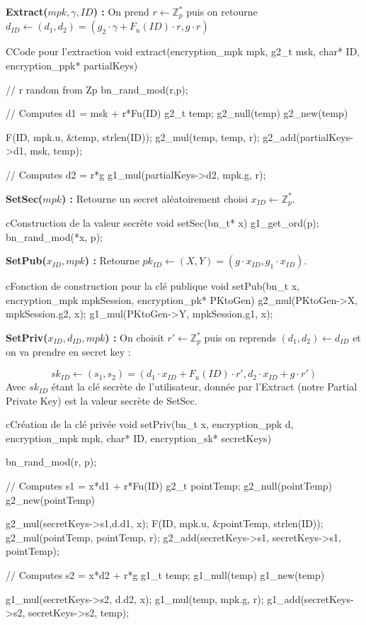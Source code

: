 \textbf{Extract($mpk, \gamma, ID$) :} On prend $r \leftarrow \mathbb{Z}_p^*$ puis on retourne $d_{ID} \leftarrow (d_1, d_2) = (g_2 \cdot \gamma + F_u(ID) \cdot r, g \cdot r)$

\begin{sourcebox}{C}{Code pour l'extraction}
	void extract(encryption_mpk mpk, g2_t msk, char* ID, encryption_ppk* partialKeys){
		// r random from Zp
		bn_rand_mod(r,p);
		
		// Computes d1 = msk + r*Fu(ID)
		g2_t temp;
		g2_null(temp)
		g2_new(temp)
		
		F(ID, mpk.u, &temp, strlen(ID));
		g2_mul(temp, temp, r);
		g2_add(partialKeys->d1, msk, temp);
		
		// Computes d2 = r*g
		g1_mul(partialKeys->d2, mpk.g, r);
	}
\end{sourcebox}

\textbf{SetSec($mpk$) :} Retourne un secret aléatoirement choisi $x_{ID} \leftarrow \mathbb{Z}_p^*$.

\begin{sourcebox}{c}{Construction de la valeur secrète}
	void setSec(bn_t* x){
		g1_get_ord(p);
		bn_rand_mod(*x, p);
	}
\end{sourcebox}

\textbf{SetPub($x_{ID}, mpk$) :} Retourne $pk_{ID} \leftarrow (X,Y) = (g \cdot x_{ID}, g_1 \cdot x_{ID})$.

\begin{sourcebox}{c}{Fonction de construction pour la clé publique}
	void setPub(bn_t x, encryption_mpk mpkSession, encryption_pk* PKtoGen){
		g2_mul(PKtoGen->X, mpkSession.g2, x);
		g1_mul(PKtoGen->Y, mpkSession.g1, x);
	}
\end{sourcebox}

\textbf{SetPriv($x_{ID}, d_{ID}, mpk$) :} On choisit $r' \leftarrow \mathbb{Z}_p^*$ puis on reprends $(d_1, d_2) \leftarrow d_{ID}$ et on va prendre en secret key : 

\[sk_{ID} \leftarrow (s_1, s_2) = (d_1 \cdot x_{ID} + F_u(ID) \cdot r', d_2 \cdot x_{ID} + g \cdot r')\]
Avec $sk_{ID}$ étant la clé secrète de l'utilisateur, donnée par l'Extract (notre Partial Private Key) est la valeur secrète de SetSec.

\begin{sourcebox}{c}{Création de la clé privée}
	void setPriv(bn_t x, encryption_ppk d, encryption_mpk mpk, char* ID, encryption_sk* secretKeys){
		bn_rand_mod(r, p);
		
		// Computes s1 = x*d1 + r*Fu(ID)
		g2_t pointTemp;
		g2_null(pointTemp)
		g2_new(pointTemp)
		
		g2_mul(secretKeys->s1,d.d1, x);
		F(ID, mpk.u, &pointTemp, strlen(ID));
		g2_mul(pointTemp, pointTemp, r);
		g2_add(secretKeys->s1, secretKeys->s1, pointTemp);
		
		// Computes s2 = x*d2 + r*g
		g1_t temp;
		g1_null(temp)
		g1_new(temp)
		
		g1_mul(secretKeys->s2, d.d2, x);
		g1_mul(temp, mpk.g, r);
		g1_add(secretKeys->s2, secretKeys->s2, temp);
	}
\end{sourcebox}

